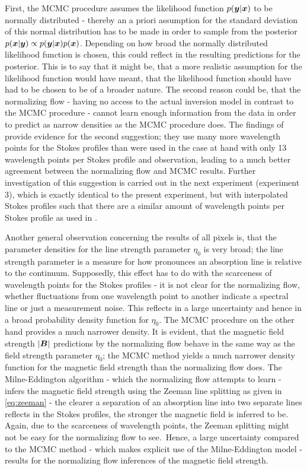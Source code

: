 \documentclass[a4paper,12pt]{report}
\begin{document}
First, the MCMC procedure assumes the likelihood function $p(\bm{y}|\bm{x})$ to be normally distributed - thereby an a priori assumption for the standard deviation of this normal distribution has to be made in order to sample from the posterior $p(\bm{x}|\bm{y}) \propto p(\bm{y}|\bm{x})p(\bm{x})$. Depending on how broad the normally distributed likelihood function is chosen, this could reflect in the resulting predictions for the posterior. This is to say that it might be, that a more realistic assumption for the likelihood function would have meant, that the likelihood function should have had to be chosen to be of a broader nature. The second reason could be, that the normalizing flow - having no access to the actual inversion model in contrast to the MCMC procedure - cannot learn enough information from the data in order to predict as narrow densities as the MCMC procedure does. The findings of \cite[p.5]{DiazBaso.2022} provide evidence for the second suggestion; they use many more wavelength points for the Stokes profiles than were used in the case at hand with only 13 wavelength points per Stokes profile and observation, leading to a much better agreement between the normalizing flow and MCMC results. Further investigation of this suggestion is carried out in the next experiment (experiment 3), which is exactly identical to the present experiment, but with interpolated Stokes profiles such that there are a similar amount of wavelength points per Stokes profile as used in \cite[p.5]{DiazBaso.2022}.

Another general observation concerning the results of all pixels is, that the parameter densities for the line strength parameter $\eta_0$ is very broad; the line strength parameter is a measure for how pronounces an absorption line is relative to the continuum. Supposedly, this effect has to do with the scarceness of wavelength points for the Stokes profiles - it is not clear for the normalizing flow, whether fluctuations from one wavelength point to another indicate a spectral line or just a measurement noise. This reflects in a large uncertainty and hence in a broad probability density function for $\eta_0$. The MCMC procedure on the other hand provides a much narrower density. It is evident, that the magnetic field strength $|\bm{B}|$ predictions by the normalizing flow behave in the same way as the field strength parameter $\eta_0$; the MCMC method yields a much narrower density function for the magnetic field strength than the normalizing flow does. The Milne-Eddington algorithm - which the normalizing flow attempts to learn - infers the magnetic field strength using the Zeeman line splitting as given in \cref{eq:zeeman} - the clearer a separation of an absorption line into two separate lines reflects in the Stokes profiles, the stronger the magnetic field is inferred to be. Again, due to the scarceness of wavelength points, the Zeeman splitting might not be easy for the normalizing flow to \flqq see\frqq.\ Hence, a large uncertainty compared to the MCMC method - which makes explicit use of the Milne-Eddington model - results for the normalizing flow inferences of the magnetic field strength.
\end{document}
